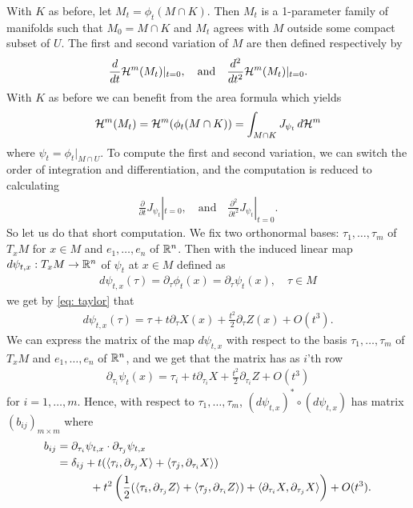 With $K$ as before, let $M_t=\phi_t(M\cap K)$. Then $M_t$ is a 1-parameter family of manifolds such that $M_0=M \cap K$ and $M_t$ agrees with $M$ outside some compact subset of $U$. The first and second variation of $M$ are then defined respectively by
\begin{align*}
    \frac{d}{dt}\mathcal{H}^m(M_t)|_{t=0}, \quad \text{and} \quad \frac{d^2}{dt^2}\mathcal{H}^m(M_t)|_{t=0}.
\end{align*}
With $K$ as before we can benefit from the area formula which yields
\begin{align*}
    \mathcal{H}^m(M_t)=\mathcal{H}^m(\phi_t(M \cap K))=\int_{M \cap K} J_{\psi_t}\, d\mathcal{H}^m
\end{align*}
where $\psi_t=\phi_t|_{M \cap U}$. To compute the first and second variation, we can switch the order of integration and differentiation, and the computation is reduced to calculating
\begin{align*}
    \frac{\partial}{\partial t}J_{\psi_t}|_{t=0}, \quad \text{and} \quad \frac{\partial^2}{\partial t^2}J_{\psi_t}|_{t=0}.
\end{align*}
So let us do that short computation. We fix two orthonormal bases: $\tau_1, \dots, \tau_m$ of $T_xM$ for $x \in M$ and $e_1, \dots, e_n$ of $\mathbb{R}^n$. Then with the induced linear map $d\psi_{t,x}:T_xM \to \mathbb{R}^n$ of $\psi_t$ at $x \in M$ defined as
\begin{align*}
    d\psi_{t,x}(\tau) = \partial_{\tau}\phi_t(x) = \partial_{\tau}\psi_t(x), \quad \tau \in M
\end{align*}
we get by \eqref{eq: taylor} that
\begin{align*}
    d\psi_{t,x}(\tau) = \tau + t\partial_{\tau}X(x) + \frac{t^2}{2}\partial_{\tau}Z(x) + O(t^3).
\end{align*}
We can express the matrix of the map $d\psi_{t,x}$ with respect to the basis $\tau_1, \dots, \tau_m$ of $T_xM$ and $e_1, \dots, e_n$ of $\mathbb{R}^n$, and we get that the matrix has as $i$'th row
\begin{align*}
    \partial_{\tau_i}\psi_t(x) = \tau_i + t\partial_{\tau_i}X + \frac{t^2}{2}\partial_{\tau_i}Z + O(t^3)
\end{align*}
for $i=1, \dots, m$. Hence, with respect to $\tau_1, \dots, \tau_m$, $(d\psi_{t,x})^*\circ(d\psi_{t,x})$ has matrix $(b_{ij})_{m \times m}$ where
\begin{align*}
    b_{ij} &= \partial_{\tau_i} \psi_{t,x} \cdot \partial_{\tau_j} \psi_{t,x} \\
    &= \delta_{ij} + t(\langle \tau_i, \partial_{\tau_j}X \rangle + \langle \tau_j, \partial_{\tau_i}X \rangle) \\ 
    & \qquad\quad + t^2\left(\frac{1}{2}(\langle \tau_i, \partial_{\tau_j}Z \rangle + \langle \tau_j, \partial_{\tau_i}Z \rangle) + \langle \partial_{\tau_i}X, \partial_{\tau_j}X \rangle\right) + O(t^3).
\end{align*}
